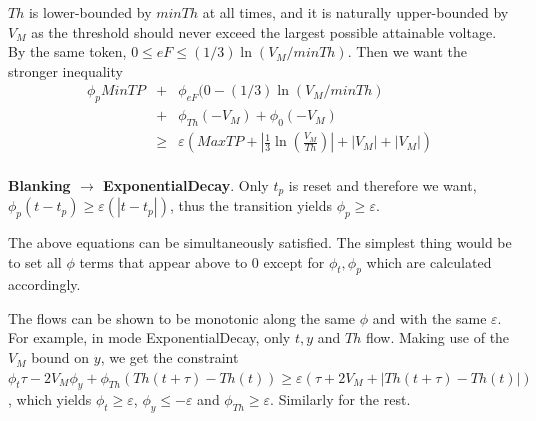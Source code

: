 \begin{prf}
	$Th$ is lower-bounded by $minTh$ at all times, and it is naturally upper-bounded by $V_M$ as the threshold should never exceed the largest possible attainable voltage. 
	By the same token, $0\leq eF \leq (1/3)\ln(V_M/minTh)$.
	Then we want the stronger inequality
	\begin{eqnarray*}
	\phi_p MinTP &+& \phi_{eF}(0-(1/3)\ln(V_M/minTh)
	\\
	&+&\phi_{Th}(-V_M) +\phi_0(-V_M)
	\\
	&\geq& \varepsilon(MaxTP+ |\frac{1}{3}\ln(\frac{V_M}{Th})|+|V_M|+|V_M|)
	\end{eqnarray*}
	\\
	\textbf{Blanking $\rightarrow$ ExponentialDecay}. Only $t_p$ is reset and therefore we want, $\phi_p(t-t_p) \geq \varepsilon(|t-t_p|)$, thus the transition yields $\phi_p \geq \varepsilon$.
	
	The above equations can be simultaneously satisfied.
	The simplest thing would be to set all $\phi$ terms that appear above to 0 except for $\phi_t,\phi_p$ which are calculated accordingly.
	
	The flows can be shown to be monotonic along the same $\phi$ and with the same $\varepsilon$.
	For example, in mode ExponentialDecay, only $t,y$ and $Th$ flow.
	Making use of the $V_M$ bound on $y$, we get the constraint
	$\phi_t \tau - 2V_M\phi_y +\phi_{Th}(Th(t+\tau)-Th(t))\geq \varepsilon(\tau+2V_M + |Th(t+\tau)-Th(t)| )$, 
	which yields $\phi_t \geq \varepsilon$, $\phi_y \leq -\varepsilon$ and $\phi_{Th} \geq \varepsilon$. 
	Similarly for the rest.	
\end{prf}

